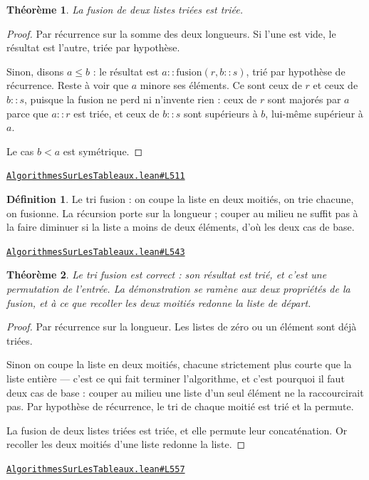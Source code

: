 \documentclass[11pt,a4paper]{article}
\theoremstyle{definition}
\newtheorem{definition}{Définition}
\theoremstyle{plain}
\newtheorem{theoreme}{Théorème}
\newcommand{\source}[2]{\par\smallskip\noindent\hfill{\footnotesize\href{#1}{\texttt{#2}}}\par\smallskip}
\begin{document}
\begin{theoreme}
La fusion de deux listes triées est triée.
\end{theoreme}
\begin{proof}
Par récurrence sur la somme des deux longueurs. Si l'une est vide, le résultat est
l'autre, triée par hypothèse.

Sinon, disons \(a \le b\) : le résultat est \(a :: \mathrm{fusion}(r, b :: s)\), trié
par hypothèse de récurrence. Reste à voir que \(a\) minore ses éléments. Ce sont ceux de
\(r\) et ceux de \(b :: s\), puisque la fusion ne perd ni n'invente rien : ceux de \(r\)
sont majorés par \(a\) parce que \(a :: r\) est triée, et ceux de \(b :: s\) sont
supérieurs à \(b\), lui-même supérieur à \(a\).

Le cas \(b < a\) est symétrique.
\end{proof}
\source{https://github.com/Commutator-IO/learn-lean/blob/main/courses/02-lycee/11-informatique-nsi/AlgorithmesSurLesTableaux.lean\#L511}{AlgorithmesSurLesTableaux.lean\#L511}

\begin{definition}
Le tri fusion : on coupe la liste en deux moitiés, on trie chacune, on fusionne.
La récursion porte sur la longueur ; couper au milieu ne suffit pas à la faire
diminuer si la liste a moins de deux éléments, d'où les deux cas de base.
\end{definition}
\source{https://github.com/Commutator-IO/learn-lean/blob/main/courses/02-lycee/11-informatique-nsi/AlgorithmesSurLesTableaux.lean\#L543}{AlgorithmesSurLesTableaux.lean\#L543}

\begin{theoreme}
Le tri fusion est correct : son résultat est trié, et c'est une permutation de
l'entrée. La démonstration se ramène aux deux propriétés de la fusion, et à ce que
recoller les deux moitiés redonne la liste de départ.
\end{theoreme}
\begin{proof}
Par récurrence sur la longueur. Les listes de zéro ou un élément sont déjà triées.

Sinon on coupe la liste en deux moitiés, chacune strictement plus courte que la liste
entière — c'est ce qui fait terminer l'algorithme, et c'est pourquoi il faut deux cas de
base : couper au milieu une liste d'un seul élément ne la raccourcirait pas. Par
hypothèse de récurrence, le tri de chaque moitié est trié et la permute.

La fusion de deux listes triées est triée, et elle permute leur concaténation. Or
recoller les deux moitiés d'une liste redonne la liste.
\end{proof}
\source{https://github.com/Commutator-IO/learn-lean/blob/main/courses/02-lycee/11-informatique-nsi/AlgorithmesSurLesTableaux.lean\#L557}{AlgorithmesSurLesTableaux.lean\#L557}
\end{document}
